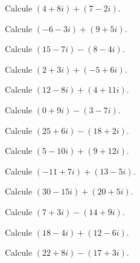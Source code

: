 \begin{ejercicio}
Calcule $(4+8i) + (7-2i)$.
\end{ejercicio}

\begin{ejercicio}
Calcule $(-6-3i) + (9+5i)$.
\end{ejercicio}

\begin{ejercicio}
Calcule $(15-7i) - (8-4i)$.
\end{ejercicio}

\begin{ejercicio}
Calcule $(2+3i) + (-5+6i)$.
\end{ejercicio}

\begin{ejercicio}
Calcule $(12-8i) + (4+11i)$.
\end{ejercicio}

\begin{ejercicio}
Calcule $(0+9i) - (3-7i)$.
\end{ejercicio}

\begin{ejercicio}
Calcule $(25+6i) - (18+2i)$.
\end{ejercicio}

\begin{ejercicio}
Calcule $(5-10i) + (9+12i)$.
\end{ejercicio}

\begin{ejercicio}
Calcule $(-11+7i) + (13-5i)$.
\end{ejercicio}

\begin{ejercicio}
Calcule $(30-15i) + (20+5i)$.
\end{ejercicio}

\begin{ejercicio}
Calcule $(7+3i) - (14+9i)$.
\end{ejercicio}

\begin{ejercicio}
Calcule $(18-4i) + (12-6i)$.
\end{ejercicio}

\begin{ejercicio}
Calcule $(22+8i) - (17+3i)$.
\end{ejercicio}

